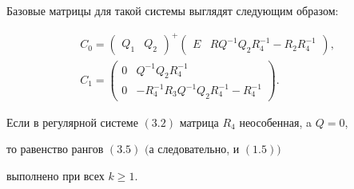  


 


Базовые матрицы для такой системы выглядят следующим образом: 


\begin{gather*} 


C_0=\begin{pmatrix}Q_1 & Q_2 \end{pmatrix}^+ 


\begin{pmatrix}E & RQ^{-1}Q_2R^{-1}_4-R_2R^{-1}_4\end{pmatrix},\\ 


C_1= 


\begin{pmatrix} 


0 & Q^{-1}Q_2R^{-1}_4 \\ 


0 & -R^{-1}_4R_3Q^{-1}Q_2R^{-1}_4-R^{-1}_4 


\end{pmatrix}. 


\end{gather*} 


 


\begin{thms} 


Если в регулярной системе $(3.2)$ матрица $R_4$ неособенная, a $Q=0$, 


то равенство рангов $(3.5)$ $($а следовательно, и $(1.5))$ 


выполнено при всех $k\ge1$. 


\end{thms} 


 


